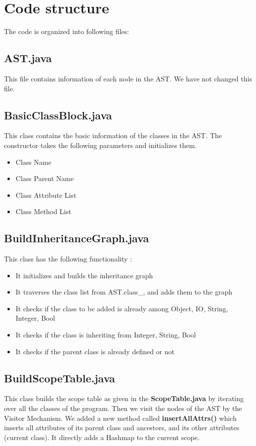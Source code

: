 \documentclass{article}
\begin{document}
\section{Code structure}
The code is organized into following files: \\

\subsection{AST.java}
This file contains information of each node in the AST. We have not changed this file.

\subsection{BasicClassBlock.java}
This class contains the basic information of the classes in the AST. The constructor takes the following parameters and initializes them.
\begin{itemize}
    \item Class Name
    \item Class Parent Name
    \item Class Attribute List
    \item Class Method List
\end{itemize}

\subsection{BuildInheritanceGraph.java}
This class has the following functionality :
\begin{itemize}

    \item It initializes and builds the inheritance graph
    \item It traverses the class list from AST.class\_, and adds them to the graph
    \item It checks if the class to be added is already among {Object, IO, String, Integer, Bool}
    \item It checks if the class is inheriting from {Integer, String, Bool}
    \item It checks if the parent class is already defined or not  

\end{itemize}

\subsection{BuildScopeTable.java}
This class builds the scope table as given in the \textbf{ScopeTable.java} by iterating over all the classes of the program. Then we visit the nodes of the AST by the Visitor Mechanism. We added a new method called \textbf{insertAllAttrs()}  which inserts all attributes of its parent class and ancestors, and its other attributes (current class). It directly adds a Hashmap to the current scope. 
\end{document}
